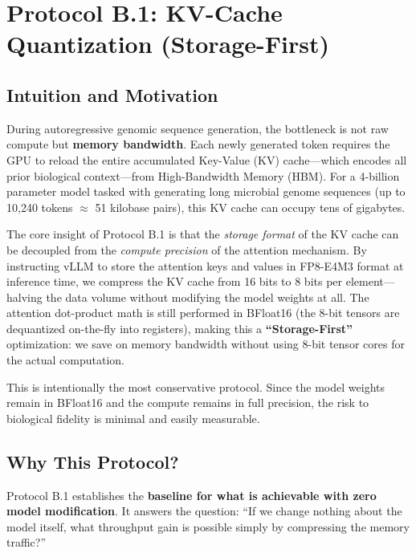 \documentclass[12pt]{article}
\begin{document}
\section{Protocol B.1: KV-Cache Quantization (Storage-First)}

\subsection{Intuition and Motivation}

During autoregressive genomic sequence generation, the bottleneck is not raw compute but \textbf{memory bandwidth}. Each newly generated token requires the GPU to reload the entire accumulated Key-Value (KV) cache—which encodes all prior biological context—from High-Bandwidth Memory (HBM). For a 4-billion parameter model tasked with generating long microbial genome sequences (up to 10,240 tokens $\approx$ 51 kilobase pairs), this KV cache can occupy tens of gigabytes.

The core insight of Protocol B.1 is that the \emph{storage format} of the KV cache can be decoupled from the \emph{compute precision} of the attention mechanism. By instructing vLLM to store the attention keys and values in FP8-E4M3 format at inference time, we compress the KV cache from 16 bits to 8 bits per element---halving the data volume without modifying the model weights at all. The attention dot-product math is still performed in BFloat16 (the 8-bit tensors are dequantized on-the-fly into registers), making this a \textbf{``Storage-First''} optimization: we save on memory bandwidth without using 8-bit tensor cores for the actual computation.

This is intentionally the most conservative protocol. Since the model weights remain in BFloat16 and the compute remains in full precision, the risk to biological fidelity is minimal and easily measurable.

\subsection{Why This Protocol?}

Protocol B.1 establishes the \textbf{baseline for what is achievable with zero model modification}. It answers the question: ``If we change nothing about the model itself, what throughput gain is possible simply by compressing the memory traffic?''
\end{document}
